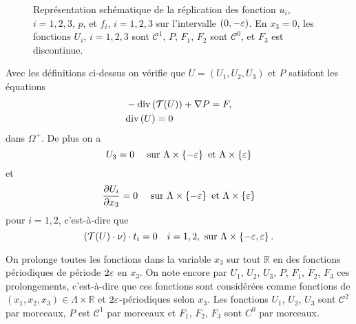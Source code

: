 \begin{figure}
  \begin{center}
    
    \caption{Représentation schématique de la réplication des fonction
    $u_i$, $i = 1,2,3$, $p$, et $f_i$, $i = 1,2,3$ sur l'intervalle
      $(0, -\varepsilon)$. En $x_3 = 0$, les fonctions $U_i$,
      $i=1,2,3$ sont $\mathcal C^1$, $P$, $F_1$, $F_2$ sont $\mathcal
      C^0$, et $F_3$ est discontinue.}
    \label{fig:solution-periodique}
  \end{center}
\end{figure}


Avec les définitions ci-dessus on vérifie que $U = (U_1, U_2, U_3)$ et
$P$ satisfont les équations
\begin{align}
  &-\mathrm{div}\left( \mathcal T(U) \right) + \nabla P = F,\label{eq:stokes-periodic-1}\\
  &\mathrm{div}\left( U \right) = 0\label{eq:stokes-periodic-2}
\end{align}
dans $\Omega^+$. De plus on a
\begin{equation}
U_3 = 0 \quad\text{ sur } \Lambda\times \left\{ -\varepsilon \right\} \text{ et } \Lambda\times \left\{ \varepsilon \right\}
\end{equation}
et
\begin{equation}
  \frac{\partial U_i}{\partial x_3} = 0\quad \text{ sur } \Lambda\times
  \left\{ -\varepsilon \right\} \text{ et } \Lambda\times \left\{ \varepsilon \right\}
\end{equation}
pour $i = 1,2$, c'est-à-dire que
\begin{equation}
\left( \mathcal T(U)\cdot \nu \right)\cdot t_i = 0\quad i = 1,2, \text{ sur } \Lambda\times
\left\{ -\varepsilon, \varepsilon \right\}.
\end{equation}

On prolonge toutes les fonctions dans la variable $x_3$ sur tout
$\mathbb R$ en des fonctions périodiques de période $2\varepsilon$ en
$x_3$. On note encore par $U_1$, $U_2$, $U_3$, $P$, $F_1$, $F_2$,
$F_3$ ces prolongements, c'est-à-dire que ces fonctions sont
considérées comme fonctions de $(x_1, x_2, x_3)\in \Lambda\times
\mathbb R$ et $2\varepsilon$-périodiques selon $x_3$. Les fonctions
$U_1$, $U_2$, $U_3$ sont $\mathcal C^2$ par morceaux, $P$ est
$\mathcal C^1$ par morceaux et $F_1$, $F_2$, $F_3$ sont $C^0$ par
morceaux.

